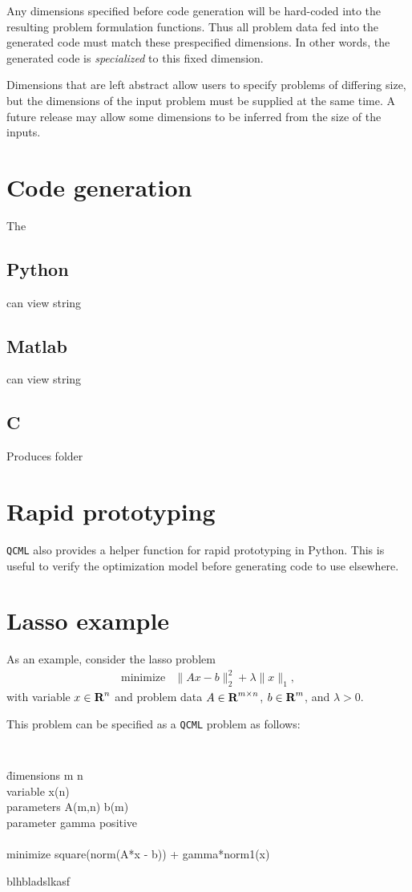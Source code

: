\documentclass[11pt]{article}
\def\qcml{\texttt{QCML}\xspace}
\newcommand{\reals}{{\mbox{\bf R}}}
\begin{document}
Any dimensions specified before code generation will be hard-coded into the
resulting problem formulation functions. Thus all problem data fed into the
generated code must match these prespecified dimensions. In other words, the
generated code is \emph{specialized} to this fixed dimension.

Dimensions that are left abstract allow users to specify problems of
differing size, but the dimensions of the input problem must be supplied at
the same time. A future release may allow some dimensions to be inferred from
the size of the inputs.

\section{Code generation}
The 
\subsection{Python}
can view string
\subsection{Matlab}
can view string
\subsection{C}
Produces folder

\section{Rapid prototyping}
\qcml also provides a helper function for rapid prototyping in Python. This
is useful to verify the optimization model before generating code to use
elsewhere.

\section{Lasso example}
As an example, consider the lasso problem
\[
\begin{array}{ll}
  \mbox{minimize} & \|Ax - b\|_2^2 + \lambda \|x\|_1,
\end{array}
\]
with variable $x \in \reals^n$ and problem data $A\in\reals^{m\times n}$, 
$b \in \reals^m$, and $\lambda > 0$.

This problem can be specified as a \qcml problem as follows:
{\tt
\begin{tabbing}
\qquad 
\= dimensions m n \\
\> variable x(n) \\
\> parameters A(m,n) b(m)\\ 
\> parameter gamma positive\\
\\
\> minimize square(norm(A*x - b)) + gamma*norm1(x)
\end{tabbing}
}
\noindent blhbladslkasf
\end{document}
